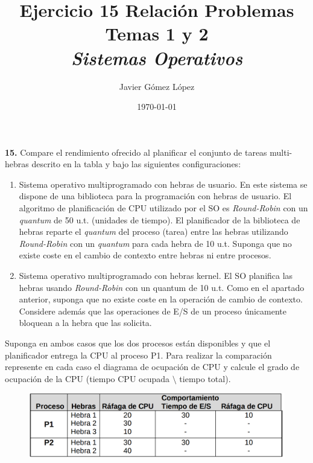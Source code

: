 \documentclass[a4paper, 12pt]{article}
\title{\textbf{Ejercicio 15 Relación Problemas Temas 1 y 2} \\ \textit{Sistemas Operativos}}
\author{Javier Gómez López}
\date{\today}
\begin{document}
\maketitle

\textbf{15.} Compare el rendimiento ofrecido al planificar el conjunto de tareas multi-hebras descrito en la tabla y bajo las siguientes configuraciones:

\begin{enumerate}[label=\alph*)]
	\item Sistema operativo multiprogramado con hebras de usuario. En este sistema se dispone de una biblioteca para la programación con hebras de usuario. El algoritmo de planificación de CPU utilizado por el SO es \textit{Round-Robin} con un \textit{quantum} de 50 u.t. (unidades de tiempo). El planificador de la biblioteca de hebras reparte el \textit{quantum} del proceso (tarea) entre las hebras utilizando \textit{Round-Robin} con un \textit{quantum} para cada hebra de 10 u.t. Suponga que no existe coste en el cambio de contexto entre hebras ni entre procesos.
	
	\item Sistema operativo multiprogramado con hebras kernel. El SO planifica las hebras usando \textit{Round-Robin} con un quantum de 10 u.t. Como en el apartado anterior, suponga que no existe coste en la operación de cambio de contexto. Considere además que las operaciones de E/S de un proceso únicamente bloquean a la hebra que las solicita.
\end{enumerate}

Suponga en ambos casos que los dos procesos están disponibles y que el planificador entrega la CPU al proceso P1. Para realizar la comparación represente en cada caso el diagrama de ocupación de CPU y calcule el grado de ocupación de la CPU (tiempo CPU ocupada \(\setminus\) tiempo total).

\begin{figure}[h]
\centering
\includegraphics[scale=0.4]{images/tabla.png}
\end{figure}

\newpage
\end{document}
